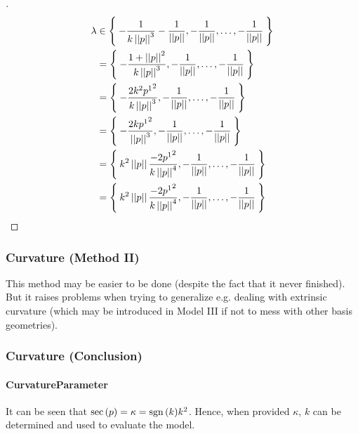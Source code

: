 \documentclass[stu, babel, american, biblatex, a4paper, leqno, draftall]{apa7}
\begin{document}
\begin{proof}[]
\begin{align*}
        \lambda &\in \Set{-\frac{1}{k\norm{p}^3} - \frac{1}{\norm{p}},-\frac{1}{\norm{p}},\dots,-\frac{1}{\norm{p}}} \\
        &= \Set{-\frac{1+\norm{p}^2}{k\norm{p}^3},-\frac{1}{\norm{p}},\dots,-\frac{1}{\norm{p}}} \\
        &= \Set{-\frac{2k^2{\tensor{p}{^1}}^2}{k\norm{p}^3},-\frac{1}{\norm{p}},\dots,-\frac{1}{\norm{p}}} \\
        &= \Set{-\frac{2k{\tensor{p}{^1}}^2}{\norm{p}^3},-\frac{1}{\norm{p}},\dots,-\frac{1}{\norm{p}}} \\
        &= \Set{k^2\norm{p}\frac{-2{\tensor{p}{^1}}^2}{k\norm{p}^4},-\frac{1}{\norm{p}},\dots,-\frac{1}{\norm{p}}} \\
        &= \Set{k^2\norm{p}\frac{-2{\tensor{p}{^1}}^2}{k\norm{p}^4},-\frac{1}{\norm{p}},\dots,-\frac{1}{\norm{p}}} \\
    \end{align*}
\end{proof}
\subsubsection{Curvature (Method II)}
This method may be easier to be done
(despite the fact that it never finished).
But it raises problems when trying to generalize e.g. dealing with extrinsic curvature
(which may be introduced in Model III
if not to mess with other basis geometries).
\begin{lemma}\label{Model:ChristoffelSymbol}

\end{lemma}
\begin{lemma}\label{Model:RiemannCurvatureTensor}

\end{lemma}
\subsubsection{Curvature (Conclusion)}
\begin{lemma}\label{Model:SectionalCurvature}

\end{lemma}
\paragraph{CurvatureParameter}
It can be seen that $\operatorname{sec}\left(p\right) = \kappa = \operatorname{sgn}{\left(k\right)}k^2$.
Hence, when provided $\kappa$, $k$ can be determined and used to evaluate the model.
\end{document}
